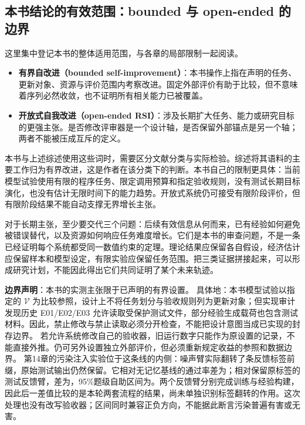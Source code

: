 \subsection{本书结论的有效范围：bounded 与 open-ended 的边界}
\label{sec:ch16-bounded}

\begin{sloppypar}
这里集中登记本书的整体适用范围，与各章的局部限制一起阅读。
\end{sloppypar}

\begin{itemize}
  \item \textbf{有界自改进（bounded self-improvement）}：本书操作上指在声明的任务、更新对象、资源与评价范围内考察改进。固定外部评价有助于比较，但不意味着序列必然收敛，也不证明所有相关能力已被覆盖。
  \item \textbf{开放式自我改进（open-ended RSI）}：涉及长期扩大任务、能力或研究目标的更强主张。是否修改评审器是一个设计轴，是否保留外部锚点是另一个轴；两者不能被压成互斥的定义。

\end{itemize}

\begin{sloppypar}
本书与上述综述使用这些词时，需要区分文献分类与实际检验。综述将其语料的主要工作归为有界改进，这是作者在该分类下的判断。本书自己的限制更具体：当前模型试验使用有限的程序任务、限定调用预算和指定验收规则，没有测试长期目标演化，也没有估计无限时间下的能力趋势。开放式系统仍可接受有限阶段评价，但有限阶段结果不能自动支撑无界增长主张。

\end{sloppypar}



\begin{sloppypar}
对于长期主张，至少要交代三个问题：后续有效信息从何而来，已有经验如何避免被错误替代，以及资源如何响应任务难度增长。它们是本书的审查问题，不是一条已经证明每个系统都受同一数值约束的定理。理论结果应保留各自假设，经济估计应保留样本和模型设定，有限实验应保留任务范围。把三类证据拼接起来，可以形成研究计划，不能因此得出它们共同证明了某个未来轨迹。

\end{sloppypar}

\begin{principlebox}
\textbf{边界声明}：本书的实测主张限于已声明的有界设置。
具体地：本书模型试验以指定的 $\mathcal V$ 为比较参照，设计上不将任务划分与验收规则列为更新对象；但实现审计发现历史 E01/E02/E03 允许读取受保护测试文件，部分经验生成载荷也包含测试材料。因此，禁止修改与禁止读取必须分开检查，不能把设计意图当成已实现的封存边界。
若允许系统修改自己的验收器，旧运行数字只能作为原设置的记录，不能直接外推。仍可另外设置独立外部评价，但必须重新规定收益的参照和数据边界。
第14章的污染注入实验位于这条线的内侧：噪声臂实际翻转了条反馈标签前缀，原始测试输出仍然保留。它相对无记忆基线的通过率差为；相对保留原标签的测试反馈臂，差为，95\%题级自助区间为\measured{$[-0.2000,+0.1125]$}。两个反馈臂分别完成训练与经验构建，因此后一差值比较的是本轮两套流程的结果，尚未单独识别标签翻转的作用。这次处理也没有改写验收器；区间同时兼容正负方向，不能据此断言污染普遍有害或无害。
\end{principlebox}

